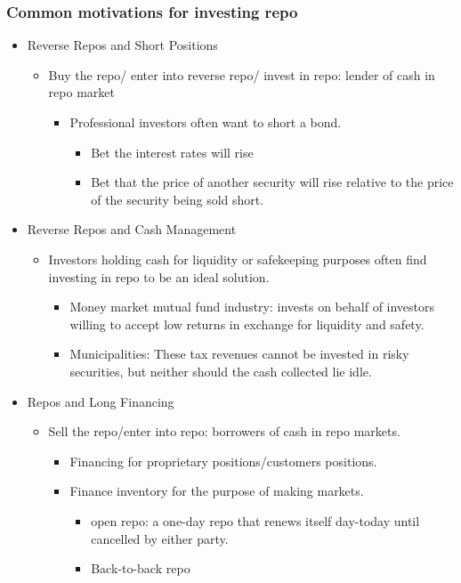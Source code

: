 \subsubsection{Common motivations for investing repo}
\begin{itemize}
\item Reverse Repos and Short Positions
    \begin{itemize}
    \item Buy the repo/ enter into reverse repo/ invest in repo: lender of cash in repo market
        \begin{itemize}
        \item Professional investors often want to short a bond.
            \begin{itemize}
            \item Bet the interest rates will rise
            \item Bet that the price of another security will rise relative
            to the price of the security being sold short.
            \end{itemize}
        \end{itemize}
    \end{itemize}
\item Reverse Repos and Cash Management
    \begin{itemize}
    \item Investors holding cash for liquidity or safekeeping purposes often find investing in repo to be an ideal solution.
        \begin{itemize}
        \item Money market mutual fund industry: invests on behalf of investors willing to accept low returns in exchange for liquidity and safety.
        \item Municipalities: These tax revenues cannot be invested in risky securities, but neither should the cash collected lie idle.
        \end{itemize}
    \end{itemize}
\item Repos and Long Financing
    \begin{itemize}
    \item Sell the repo/enter into repo: borrowers of cash in repo markets.
        \begin{itemize}
        \item Financing for proprietary positions/customers positions.
        \item Finance inventory for the purpose of making markets.
            \begin{itemize}
            \item open repo: a one-day repo that renews itself day-today until cancelled by either party.
            \item Back-to-back repo
            \end{itemize}


\end{itemize}
\end{itemize}
\end{itemize}

